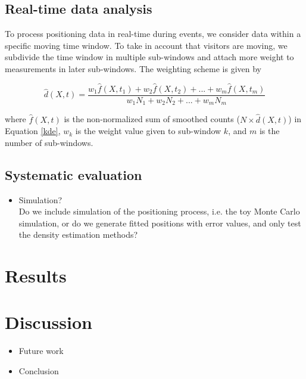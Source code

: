 \documentclass[10pt,a4paper]{article}
\begin{document}
\subsection{Real-time data analysis}

To process positioning data in real-time during events, we consider data within a specific moving time window.
To take in account that visitors are moving, we subdivide the time window in multiple sub-windows and attach more weight to measurements in later sub-windows. The weighting scheme is given by

\begin{equation}
\hat{d}(X,t)=\frac{w_{1}\hat{f}(X,t_{1})+w_{2}\hat{f}(X,t_{2})+...+w_{m}\hat{f}(X,t_{m})}{w_{1}N_{1}+w_{2}N_{2}+...+w_{m}N_{m}}
\end{equation}

\noindent where $\hat{f}(X,t)$ is the non-normalized sum of smoothed counts ($N\times\hat{d}(X,t)$) in Equation \ref{kde}, $w_{k}$ is the weight value given to sub-window $k$, and $m$ is the number of sub-windows.

\subsection{Systematic evaluation}

\begin{itemize}
\item Simulation?\\
Do we include simulation of the positioning process, i.e. the toy Monte Carlo simulation, or do we generate fitted positions with error values, and only test the density estimation methods?
\end{itemize}

\section{Results}



\section{Discussion}

\begin{itemize}
\item Future work
\item Conclusion
\end{itemize}



\end{document}
